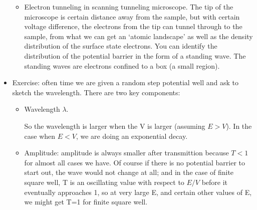 \documentclass{school-22.101-notes}
\begin{document}
\begin{itemize}
\begin{itemize}
\item Electron tunneling in scanning tunneling microscope. The tip of the microscope is certain distance away from the sample, but with certain voltage difference, the electrons from the tip can tunnel through to the sample, from what we can get an `atomic landscape' as well as the density distribution of the surface state electrons. You can identify the distribution of the potential barrier in the form of a standing wave. The standing waves are electrons confined to a box (a small region). 
\end{itemize}

\item Exercise: often time we are given a random step potential well and ask to sketch the wavelength. There are two key components: 

    \begin{itemize}
    \item Wavelength $\lambda$. 
    
    So the wavelength is larger when the V is larger (assuming $E > V$). In the case when $E<V$, we are doing an exponential decay.  
    
    \item Amplitude: amplitude is always smaller after transmittion because $T<1$ for almost all cases we have. Of course if there is no potential barrier to start out, the wave would not change at all; and in the case of finite square well, T is an oscillating value with respect to $E/V$ before it eventually approaches 1, so at very large E, and certain other values of E, we might get T=1 for finite square well.  
    
    \end{itemize}


\end{itemize}
\end{document}

